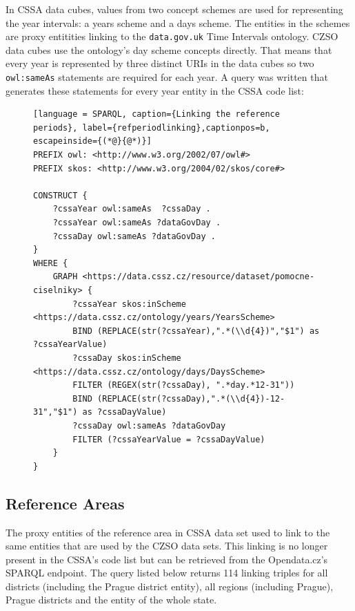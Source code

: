In CSSA data cubes, values from two concept schemes are used for representing the year intervals: a years scheme and a days scheme. The entities in the schemes are proxy entitities linking to the \verb|data.gov.uk| Time Intervals ontology. CZSO data cubes use the ontology's day scheme concepts directly. That means that every year is represented by three distinct URIs in the data cubes so two \verb|owl:sameAs| statements are required for each year. A query was written that generates these statements for every year entity in the CSSA code list:

\begin{figure}[h]
\begin{lstlisting}[language = SPARQL, caption={Linking the reference periods}, label={refperiodlinking},captionpos=b, escapeinside={(*@}{@*)}]
PREFIX owl: <http://www.w3.org/2002/07/owl#>
PREFIX skos: <http://www.w3.org/2004/02/skos/core#>
    
CONSTRUCT {
    ?cssaYear owl:sameAs  ?cssaDay .
    ?cssaYear owl:sameAs ?dataGovDay .
    ?cssaDay owl:sameAs ?dataGovDay .
}  
WHERE {
    GRAPH <https://data.cssz.cz/resource/dataset/pomocne-ciselniky> {
        ?cssaYear skos:inScheme <https://data.cssz.cz/ontology/years/YearsScheme>
        BIND (REPLACE(str(?cssaYear),".*(\\d{4})","$1") as ?cssaYearValue)
        ?cssaDay skos:inScheme <https://data.cssz.cz/ontology/days/DaysScheme>
        FILTER (REGEX(str(?cssaDay), ".*day.*12-31"))
        BIND (REPLACE(str(?cssaDay),".*(\\d{4})-12-31","$1") as ?cssaDayValue)
        ?cssaDay owl:sameAs ?dataGovDay
        FILTER (?cssaYearValue = ?cssaDayValue)
    }
}
\end{lstlisting}
\end{figure}

\subsection{Reference Areas}

The proxy entities of the reference area in CSSA data set used to link to the same entities that are used by the CZSO data sets. This linking is no longer present in the CSSA's code list but can be retrieved from the Opendata.cz's SPARQL endpoint. The query listed below returns 114 linking triples for all districts (including the Prague district entity), all regions (including Prague), Prague districts and the entity of the whole state.

